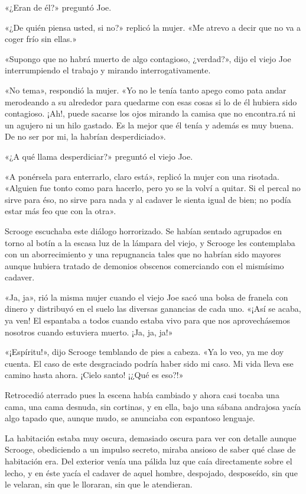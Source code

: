 \documentclass{novela}
\begin{document}
 «¿Eran de él?» preguntó Joe.

 «¿De quién piensa usted, si no?» replicó la mujer. «Me atrevo a decir que no va a coger frío sin ellas.»

 «Supongo que no habrá muerto de algo contagioso, ¿verdad?», dijo el viejo Joe interrumpiendo el trabajo y mirando interrogativamente.

 «No tema», respondió la mujer. «Yo no le tenía tanto apego como pata andar merodeando a su alrededor para quedarme con esas cosas si lo de él hubiera sido contagioso. ¡Ah!, puede sacarse los ojos mirando la camisa que no encontra.rá ni un agujero ni un hilo gastado. Es la mejor que él tenía y además es muy buena. De no ser por mi, la habrían desperdiciado».

 «¿A qué llama desperdiciar?» preguntó el viejo Joe.

 «A ponérsela para enterrarlo, claro está», replicó la mujer con una risotada. «Alguien fue tonto como para hacerlo, pero yo se la volví a quitar. Si el percal no sirve para éso, no sirve para nada y al cadaver le sienta igual de bien; no podía estar más feo que con la otra».

 Scrooge escuchaba este diálogo horrorizado. Se habían sentado agrupados en torno al botín a la escasa luz de la lámpara del viejo, y Scrooge les contemplaba con un aborrecimiento y una repugnancia tales que no habrían sido mayores aunque hubiera tratado de demonios obscenos comerciando con el mismísimo cadaver.

 «Ja, ja», rió la misma mujer cuando el viejo Joe sacó una bolsa de franela con dinero y distribuyó en el suelo las diversas ganancias de cada uno. «¡Así se acaba, ya ven! El espantaba a todos cuando estaba vivo para que nos aprovechásemos nosotros cuando estuviera muerto. ¡Ja, ja, ja!»

 «¡Espíritu!», dijo Scrooge temblando de pies a cabeza. «Ya lo veo, ya me doy cuenta. El caso de este desgraciado podría haber sido mi caso. Mi vida lleva ese camino hasta ahora. ¡Cielo santo! ¡¿Qué es eso?!»

 Retrocedió aterrado pues la escena había cambiado y ahora casi tocaba una cama, una cama desnuda, sin cortinas, y en ella, bajo una sábana andrajosa yacía algo tapado que, aunque mudo, se anunciaba con espantoso lenguaje.

 La habitación estaba muy oscura, demasiado oscura para ver con detalle aunque Scrooge, obediciendo a un impulso secreto, miraba ansioso de saber qué clase de habitación era. Del exterior venía una pálida luz que caía directamente sobre el lecho, y en éste yacía el cadaver de aquel hombre, despojado, desposeído, sin que le velaran, sin que le lloraran, sin que le atendieran.
\end{document}
